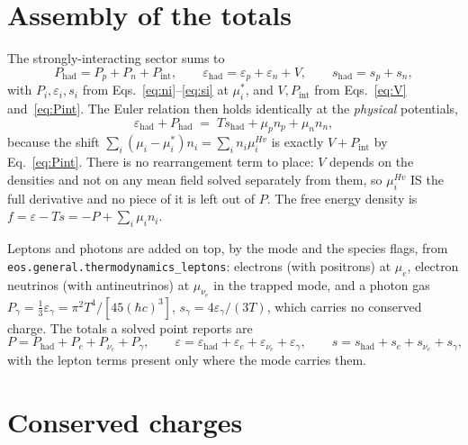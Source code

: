 \documentclass[aps,prc,onecolumn,superscriptaddress,nofootinbib,10pt]{revtex4-2}
\newcommand{\munue}{\mu_{\nu_e}}
\newcommand{\mueff}[1]{\mu^{*}_{#1}}
\newcommand{\muHv}[1]{\mu^{Hv}_{#1}}
\begin{document}
\section{Assembly of the totals}
\label{sec:assembly}

The strongly-interacting sector sums to
%
\begin{equation}
P_{\mathrm{had}} = P_p + P_n + P_{\mathrm{int}} , \qquad
\varepsilon_{\mathrm{had}} = \varepsilon_p + \varepsilon_n + V , \qquad
s_{\mathrm{had}} = s_p + s_n ,
\end{equation}
%
with $P_i, \varepsilon_i, s_i$ from Eqs.~\eqref{eq:ni}--\eqref{eq:si} at
$\mueff{i}$, and $V, P_{\mathrm{int}}$ from Eqs.~\eqref{eq:V}
and~\eqref{eq:Pint}. The Euler relation then holds identically at the
\emph{physical} potentials,
%
\begin{equation}
\varepsilon_{\mathrm{had}} + P_{\mathrm{had}}
  \;=\; T s_{\mathrm{had}} + \mu_p n_p + \mu_n n_n ,
\label{eq:euler}
\end{equation}
%
because the shift $\sum_i (\mu_i - \mueff{i}) n_i = \sum_i n_i \muHv{i}$ is
exactly $V + P_{\mathrm{int}}$ by Eq.~\eqref{eq:Pint}. There is no
rearrangement term to place: $V$ depends on the densities and not on any
mean field solved separately from them, so $\muHv{i}$ IS the full derivative
and no piece of it is left out of $P$. The free energy density is
$f = \varepsilon - Ts = -P + \sum_i \mu_i n_i$.

Leptons and photons are added on top, by the mode and the species flags, from
\texttt{eos.general.thermodynamics\_leptons}: electrons (with positrons) at
$\mu_e$, electron neutrinos (with antineutrinos) at $\munue$ in the trapped
mode, and a photon gas
$P_\gamma = \tfrac13 \varepsilon_\gamma = \pi^2 T^4 / [45 (\hbar c)^3]$,
$s_\gamma = 4 \varepsilon_\gamma / (3T)$, which carries no conserved charge.
The totals a solved point reports are
%
\begin{equation}
P = P_{\mathrm{had}} + P_e + P_{\nu_e} + P_\gamma , \qquad
\varepsilon = \varepsilon_{\mathrm{had}} + \varepsilon_e
              + \varepsilon_{\nu_e} + \varepsilon_\gamma , \qquad
s = s_{\mathrm{had}} + s_e + s_{\nu_e} + s_\gamma ,
\end{equation}
%
with the lepton terms present only where the mode carries them.

\section{Conserved charges}
\end{document}
